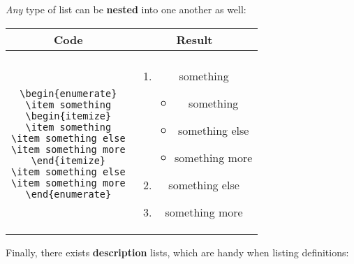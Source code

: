 \textit{Any} type of list can be \textbf{nested} into one another as well:\\

\begin{center}
\begin{tabular}{cc}

Code & Result\\
\hline\\

\parbox{4cm}{
	\texttt{\textbackslash begin\{enumerate\}\\
	\textbackslash item something\\
	\textbackslash begin\{itemize\}\\
	\textbackslash item something\\
	\textbackslash item something else\\
	\textbackslash item something more\\
	\textbackslash end\{itemize\}\\
	\textbackslash item something else\\
	\textbackslash item something more\\
	\textbackslash end\{enumerate\}\\
	}
} 

&

\parbox{4cm}{
	\begin{enumerate}
	\item something
		\begin{itemize}
		\item something
		\item something else
		\item something more
		\end{itemize}

	\item something else
	\item something more
	\end{enumerate}
}
\end{tabular}
\end{center}


Finally, there exists \textbf{description} lists, which are handy when listing definitions:\\


